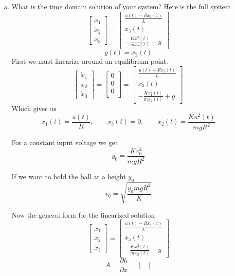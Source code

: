 \documentclass{article}
\begin{document}
\begin{enumerate}[a.]
\item What is the time domain solution of your system?
\newline
Here is the full system
$$
\begin{bmatrix}
\dot{x}_1 \\
\dot{x}_2 \\
\dot{x}_3
\end{bmatrix}
=
\begin{bmatrix}
\frac{u(t)-Rx_1(t)}{L} \\
x_3(t) \\
-\frac{Kx_1^2(t)}{mx_2(t)} + g
\end{bmatrix}
$$
$$
y(t) = x_2(t)
$$
First we must linearize around an equilibrium point.
$$
\begin{bmatrix}
\dot{x}_1 \\
\dot{x}_2 \\
\dot{x}_3
\end{bmatrix}
=
\begin{bmatrix}
0 \\
0 \\
0 \\
\end{bmatrix}
=
\begin{bmatrix}
\frac{u(t)-Rx_1(t)}{L} \\
x_3(t) \\
-\frac{Kx_1^2(t)}{mx_2(t)} + g
\end{bmatrix}
$$
Which gives us
$$ x_1(t) = \frac{u(t)}{R}, \qquad x_3(t) = 0, \qquad x_2(t) = \frac{Ku^2(t)}{mgR^2} $$
\begin{minipage}{.45\textwidth}
    For a constant input voltage we get
    $$ y_0 = \frac{Kv_0^2}{mgR^2} $$
\end{minipage}
\hfill
\begin{minipage}{.45\textwidth}
    If we want to hold the ball at a height $y_0$
    $$ v_0 = \sqrt{\frac{y_0mgR^2}{K}} $$
\end{minipage}%
Now the general form for the linearized solution
$$
\begin{bmatrix}
\dot{x}_1 \\
\dot{x}_2 \\
\dot{x}_3
\end{bmatrix}
=
\begin{bmatrix}
\frac{u(t)-Rx_1(t)}{L} \\
x_3(t) \\
-\frac{Kx_1^2(t)}{mx_2(t)} + g
\end{bmatrix}
$$
$$
A
=
\frac{\partial h}{\partial x}
=
\begin{bmatrix}

\end{bmatrix}$$
\end{enumerate}
\end{document}
